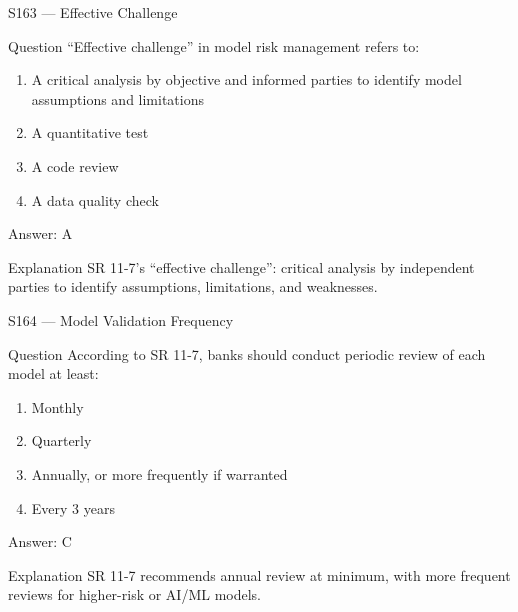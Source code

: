 \documentclass[aspectratio=169,8pt]{beamer}
\begin{document}
	\begin{frame}{S163 --- Effective Challenge}
		\begin{block}{Question}
			``Effective challenge'' in model risk management refers to:
			\begin{enumerate}
				\item A critical analysis by objective and informed parties to identify model assumptions and limitations
				\item A quantitative test
				\item A code review
				\item A data quality check
			\end{enumerate}
		\end{block}
		\begin{exampleblock}{Answer: A}\end{exampleblock}
		\begin{block}{Explanation}
			SR 11-7's ``effective challenge'': critical analysis by independent parties to identify assumptions, limitations, and weaknesses.
		\end{block}
	\end{frame}
	
	\begin{frame}{S164 --- Model Validation Frequency}
		\begin{block}{Question}
			According to SR 11-7, banks should conduct periodic review of each model at least:
			\begin{enumerate}
				\item Monthly
				\item Quarterly
				\item Annually, or more frequently if warranted
				\item Every 3 years
			\end{enumerate}
		\end{block}
		\begin{exampleblock}{Answer: C}\end{exampleblock}
		\begin{block}{Explanation}
			SR 11-7 recommends annual review at minimum, with more frequent reviews for higher-risk or AI/ML models.
		\end{block}
	\end{frame}
	
\end{document}
